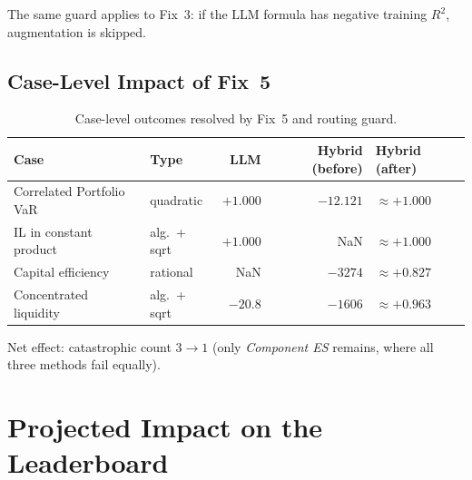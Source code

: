 \documentclass[twoside,11pt]{article}
\begin{document}
The same guard applies to Fix~3: if the LLM formula has negative training
$R^2$, augmentation is skipped.

\subsection{Case-Level Impact of Fix~5}

\begin{table}[h]
\centering
\caption{Case-level outcomes resolved by Fix~5 and routing guard.}
\label{tab:fix5_cases}
\begin{tabular}{llrrl}
\toprule
\textbf{Case} & \textbf{Type} & \textbf{LLM} & \textbf{Hybrid (before)} & \textbf{Hybrid (after)} \\
\midrule
Correlated Portfolio VaR & quadratic     & $+1.000$ & $-12.121$ & $\approx+1.000$ \\
IL in constant product   & alg.\ + sqrt  & $+1.000$ & NaN       & $\approx+1.000$ \\
Capital efficiency       & rational      & NaN      & $-3274$   & $\approx+0.827$ \\
Concentrated liquidity   & alg.\ + sqrt  & $-20.8$  & $-1606$   & $\approx+0.963$ \\
\bottomrule
\end{tabular}
\end{table}

Net effect: catastrophic count $3 \to 1$ (only \emph{Component ES} remains,
where all three methods fail equally).

\section{Projected Impact on the Leaderboard}
\label{sec:leaderboard}
\end{document}
